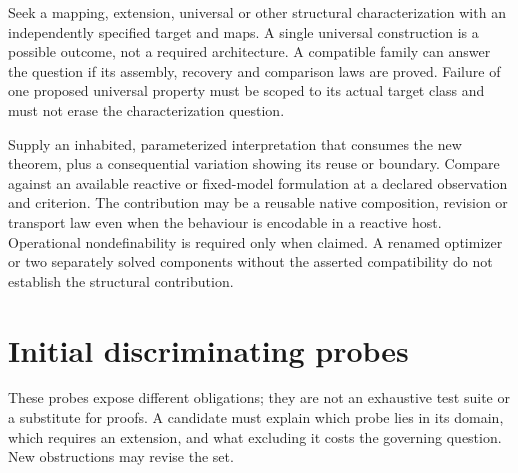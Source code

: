 \documentclass[11pt]{article}
\begin{document}
Seek a mapping, extension, universal or other structural characterization with an independently specified target and maps. A single universal construction is a possible outcome, not a required architecture. A compatible family can answer the question if its assembly, recovery and comparison laws are proved. Failure of one proposed universal property must be scoped to its actual target class and must not erase the characterization question.

Supply an inhabited, parameterized interpretation that consumes the new theorem, plus a consequential variation showing its reuse or boundary. Compare against an available reactive or fixed-model formulation at a declared observation and criterion. The contribution may be a reusable native composition, revision or transport law even when the behaviour is encodable in a reactive host. Operational nondefinability is required only when claimed. A renamed optimizer or two separately solved components without the asserted compatibility do not establish the structural contribution.

\section{Initial discriminating probes}\label{sec:probes}

These probes expose different obligations; they are not an exhaustive test suite or a substitute for proofs. A candidate must explain which probe lies in its domain, which requires an extension, and what excluding it costs the governing question. New obstructions may revise the set.
\end{document}
